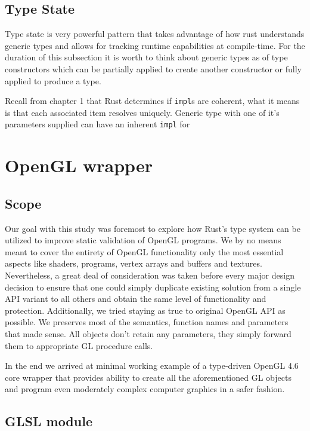\subsection{Type State}

Type state is very powerful pattern that takes advantage of how rust understands generic types and allows for tracking runtime capabilities at compile-time.
For the duration of this subsection it is worth to think about generic types as of type constructors which can be partially applied to create another constructor or fully applied to produce a type.

Recall from chapter 1 that Rust determines if \texttt{impl}s are coherent, what it means is that each associated item resolves uniquely.
Generic type with one of it's parameters supplied can have an inherent \texttt{impl} for 

\section{OpenGL wrapper}
  
\subsection*{Scope}

Our goal with this study was foremost to explore how Rust's type system can be utilized to improve static validation of OpenGL programs.
We by no means meant to cover the entirety of OpenGL functionality only the most essential aspects like shaders, programs, vertex arrays and buffers and textures.
Nevertheless, a great deal of consideration was taken before every major design decision to ensure that one could simply duplicate existing solution from a single 
API variant to all others and obtain the same level of functionality and protection.
Additionally, we tried staying as true to original OpenGL API as possible. We preserves most of the semantics, function names and parameters that made sense.
All objects don't retain any parameters, they simply forward them to appropriate GL procedure calls. 

In the end we arrived at minimal working example of a type-driven OpenGL 4.6 core wrapper that provides ability to create all the aforementioned GL objects
and program even moderately complex computer graphics in a safer fashion.

\subsection{GLSL module}

